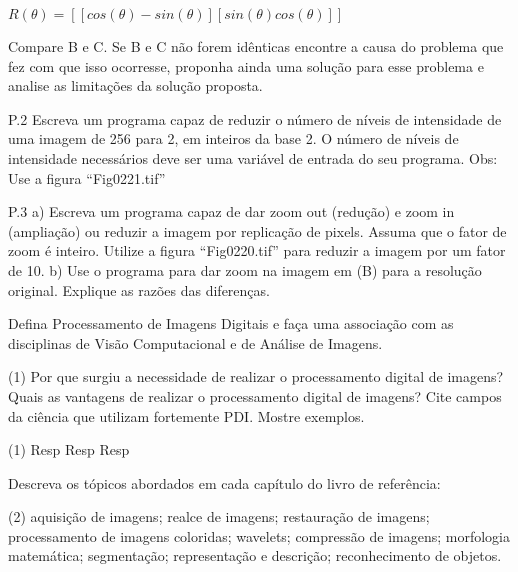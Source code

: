\documentclass[12pt,a4paper]{article}
\begin{document}
$R(\theta) = [[cos(\theta) -sin(\theta)][sin(\theta) cos(\theta)]]$

Compare B e C. Se B e C não forem idênticas encontre a causa do problema que fez com que isso ocorresse, proponha ainda uma solução para esse problema e analise as limitações da solução proposta.


P.2 Escreva um programa capaz de reduzir o número de níveis de intensidade de uma imagem de 256 para 2, em inteiros da base 2. O número de níveis de intensidade necessários deve ser uma variável de entrada do seu programa. Obs: Use a figura “Fig0221.tif”


P.3 a) Escreva um programa capaz de dar zoom out (redução) e zoom in (ampliação) ou reduzir a imagem por replicação de pixels. Assuma que o fator de zoom é inteiro. Utilize a figura “Fig0220.tif” para reduzir a imagem por um fator de 10.
b) Use o programa para dar zoom na imagem em (B) para a resolução original. Explique as razões das diferenças.


\begin{question}{1}
    Defina Processamento de Imagens Digitais e faça uma associação com as
    disciplinas de Visão Computacional e de Análise de Imagens.
    \begin{tasks}(1)
        \task Por que surgiu a necessidade de realizar o processamento digital de imagens?
        \task Quais as vantagens de realizar o processamento digital de imagens?
        \task Cite campos da ciência que utilizam fortemente PDI. Mostre exemplos.
    \end{tasks}
\end{question}

\begin{solution}
    \begin{tasks}(1)
        \task Resp
        \task Resp 
        \task Resp
    \end{tasks}
\end{solution}


\begin{question}{1}
    Descreva os tópicos abordados em cada capítulo do livro de referência:
    \begin{tasks}(2)
        \task aquisição de imagens;
        \task realce de imagens;
        \task restauração de imagens;
        \task processamento de imagens coloridas;
        \task wavelets;
        \task compressão de imagens;
        \task morfologia matemática;
        \task segmentação;
        \task representação e descrição;
        \task reconhecimento de objetos.
    \end{tasks}
\end{question}
\end{document}

